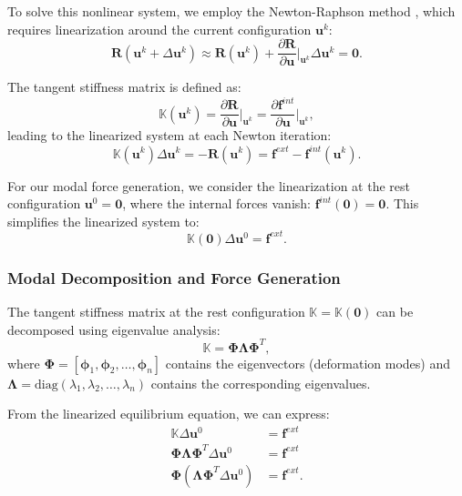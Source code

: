 To solve this nonlinear system, we employ the Newton-Raphson method \cite{Dedieu_2015}, which requires linearization around the current configuration $\bm{u}^k$:
\begin{equation}
    \bm{R}(\bm{u}^k + \Delta\bm{u}^k) \approx \bm{R}(\bm{u}^k) + \frac{\partial \bm{R}}{\partial \bm{u}}\bigg|_{\bm{u}^k} \Delta\bm{u}^k = \bm{0}.
\end{equation}

The tangent stiffness matrix is defined as:
\begin{equation}
    \mathbb{K}(\bm{u}^k) = \frac{\partial \bm{R}}{\partial \bm{u}}\bigg|_{\bm{u}^k} = \frac{\partial \bm{f}^{int}}{\partial \bm{u}}\bigg|_{\bm{u}^k},
\end{equation}
leading to the linearized system at each Newton iteration:
\begin{equation}
    \mathbb{K}(\bm{u}^k) \Delta\bm{u}^k = -\bm{R}(\bm{u}^k) = \bm{f}^{ext} - \bm{f}^{int}(\bm{u}^k).
\end{equation}

For our modal force generation, we consider the linearization at the rest configuration $\bm{u}^0 = \bm{0}$, where the internal forces vanish: $\bm{f}^{int}(\bm{0}) = \bm{0}$. This simplifies the linearized system to:
\begin{equation}
    \mathbb{K}(\bm{0}) \Delta\bm{u}^0 = \bm{f}^{ext}.
\end{equation}

\subsubsection{Modal Decomposition and Force Generation}

The tangent stiffness matrix at the rest configuration $\mathbb{K} = \mathbb{K}(\bm{0})$ can be decomposed using eigenvalue analysis:
\begin{equation}
    \mathbb{K} = \boldsymbol{\Phi} \boldsymbol{\Lambda} \boldsymbol{\Phi}^T,
\end{equation}
where $\boldsymbol{\Phi} = [\bm{\phi}_1, \bm{\phi}_2, \ldots, \bm{\phi}_n]$ contains the eigenvectors (deformation modes) and $\boldsymbol{\Lambda} = \text{diag}(\lambda_1, \lambda_2, \ldots, \lambda_n)$ contains the corresponding eigenvalues.

From the linearized equilibrium equation, we can express:
\begin{align}
    \mathbb{K} \Delta\bm{u}^0 &= \bm{f}^{ext} \\
    \boldsymbol{\Phi} \boldsymbol{\Lambda} \boldsymbol{\Phi}^T \Delta\bm{u}^0 &= \bm{f}^{ext} \\
    \boldsymbol{\Phi} (\boldsymbol{\Lambda} \boldsymbol{\Phi}^T \Delta\bm{u}^0) &= \bm{f}^{ext}.
\end{align}

